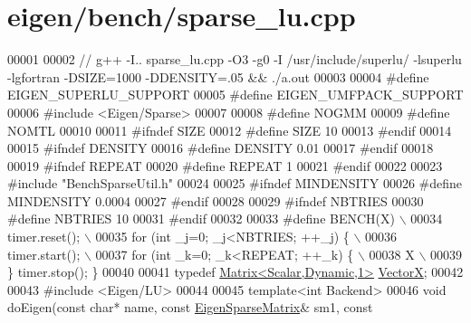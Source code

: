 \hypertarget{eigen_2bench_2sparse__lu_8cpp_source}{}\section{eigen/bench/sparse\+\_\+lu.cpp}
\label{eigen_2bench_2sparse__lu_8cpp_source}

\begin{DoxyCode}
00001 
00002 \textcolor{comment}{// g++ -I.. sparse\_lu.cpp -O3 -g0 -I /usr/include/superlu/ -lsuperlu -lgfortran -DSIZE=1000 -DDENSITY=.05
       && ./a.out}
00003 
00004 \textcolor{preprocessor}{#define EIGEN\_SUPERLU\_SUPPORT}
00005 \textcolor{preprocessor}{#define EIGEN\_UMFPACK\_SUPPORT}
00006 \textcolor{preprocessor}{#include <Eigen/Sparse>}
00007 
00008 \textcolor{preprocessor}{#define NOGMM}
00009 \textcolor{preprocessor}{#define NOMTL}
00010 
00011 \textcolor{preprocessor}{#ifndef SIZE}
00012 \textcolor{preprocessor}{#define SIZE 10}
00013 \textcolor{preprocessor}{#endif}
00014 
00015 \textcolor{preprocessor}{#ifndef DENSITY}
00016 \textcolor{preprocessor}{#define DENSITY 0.01}
00017 \textcolor{preprocessor}{#endif}
00018 
00019 \textcolor{preprocessor}{#ifndef REPEAT}
00020 \textcolor{preprocessor}{#define REPEAT 1}
00021 \textcolor{preprocessor}{#endif}
00022 
00023 \textcolor{preprocessor}{#include "BenchSparseUtil.h"}
00024 
00025 \textcolor{preprocessor}{#ifndef MINDENSITY}
00026 \textcolor{preprocessor}{#define MINDENSITY 0.0004}
00027 \textcolor{preprocessor}{#endif}
00028 
00029 \textcolor{preprocessor}{#ifndef NBTRIES}
00030 \textcolor{preprocessor}{#define NBTRIES 10}
00031 \textcolor{preprocessor}{#endif}
00032 
00033 \textcolor{preprocessor}{#define BENCH(X) \(\backslash\)}
00034 \textcolor{preprocessor}{  timer.reset(); \(\backslash\)}
00035 \textcolor{preprocessor}{  for (int \_j=0; \_j<NBTRIES; ++\_j) \{ \(\backslash\)}
00036 \textcolor{preprocessor}{    timer.start(); \(\backslash\)}
00037 \textcolor{preprocessor}{    for (int \_k=0; \_k<REPEAT; ++\_k) \{ \(\backslash\)}
00038 \textcolor{preprocessor}{        X  \(\backslash\)}
00039 \textcolor{preprocessor}{  \} timer.stop(); \}}
00040 
00041 \textcolor{keyword}{typedef} \hyperlink{group___core___module}{Matrix<Scalar,Dynamic,1>} \hyperlink{group___core___module}{VectorX};
00042 
00043 \textcolor{preprocessor}{#include <Eigen/LU>}
00044 
00045 \textcolor{keyword}{template}<\textcolor{keywordtype}{int} Backend>
00046 \textcolor{keywordtype}{void} doEigen(\textcolor{keyword}{const} \textcolor{keywordtype}{char}* name, \textcolor{keyword}{const} \hyperlink{group___sparse_core___module}{EigenSparseMatrix}& sm1, \textcolor{keyword}{const} 

\end{DoxyCode}
